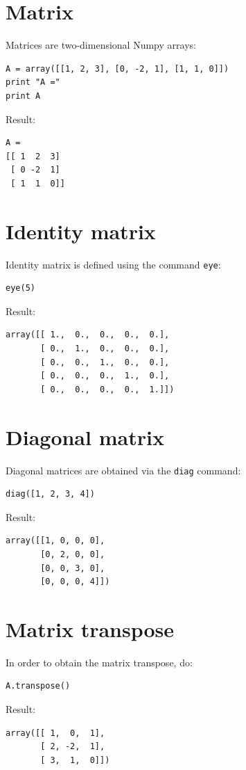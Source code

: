\documentclass[article,A4,12pt]{llncs}
\begin{document}
\section{Matrix}

Matrices are two-dimensional Numpy arrays:
\begin{verbatim}
A = array([[1, 2, 3], [0, -2, 1], [1, 1, 0]])
print "A ="
print A
\end{verbatim}
Result:
\begin{verbatim}
A =
[[ 1  2  3]
 [ 0 -2  1]
 [ 1  1  0]]
\end{verbatim}


\section{Identity matrix}

Identity matrix is defined using the command {\tt eye}:
\begin{verbatim}
eye(5)
\end{verbatim}
Result:
\begin{verbatim}
array([[ 1.,  0.,  0.,  0.,  0.],
       [ 0.,  1.,  0.,  0.,  0.],
       [ 0.,  0.,  1.,  0.,  0.],
       [ 0.,  0.,  0.,  1.,  0.],
       [ 0.,  0.,  0.,  0.,  1.]])
\end{verbatim}

\section{Diagonal matrix}

Diagonal matrices are obtained via the {\tt diag} command:
\begin{verbatim}
diag([1, 2, 3, 4])
\end{verbatim}
Result:
\begin{verbatim}
array([[1, 0, 0, 0],
       [0, 2, 0, 0],
       [0, 0, 3, 0],
       [0, 0, 0, 4]])
\end{verbatim}

\section{Matrix transpose}

In order to obtain the matrix transpose, do:
\begin{verbatim}
A.transpose()
\end{verbatim}
Result:
\begin{verbatim}
array([[ 1,  0,  1],
       [ 2, -2,  1],
       [ 3,  1,  0]])
\end{verbatim}
\end{document}
